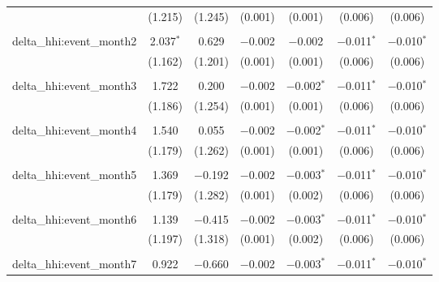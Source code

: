 \begin{table}[H]
{\begin{tabular}{@{\extracolsep{5pt}}lcccccc}
   & (1.215) & (1.245) & (0.001) & (0.001) & (0.006) & (0.006) \\  

   & & & & & & \\  

  delta\_hhi:event\_month2 & 2.037$^{*}$ & 0.629 & $-$0.002 & $-$0.002 & $-$0.011$^{*}$ & $-$0.010$^{*}$ \\  

   & (1.162) & (1.201) & (0.001) & (0.001) & (0.006) & (0.006) \\  

   & & & & & & \\  

  delta\_hhi:event\_month3 & 1.722 & 0.200 & $-$0.002 & $-$0.002$^{*}$ & $-$0.011$^{*}$ & $-$0.010$^{*}$ \\  

   & (1.186) & (1.254) & (0.001) & (0.001) & (0.006) & (0.006) \\  

   & & & & & & \\  

  delta\_hhi:event\_month4 & 1.540 & 0.055 & $-$0.002 & $-$0.002$^{*}$ & $-$0.011$^{*}$ & $-$0.010$^{*}$ \\  

   & (1.179) & (1.262) & (0.001) & (0.001) & (0.006) & (0.006) \\  

   & & & & & & \\  

  delta\_hhi:event\_month5 & 1.369 & $-$0.192 & $-$0.002 & $-$0.003$^{*}$ & $-$0.011$^{*}$ & $-$0.010$^{*}$ \\  

   & (1.179) & (1.282) & (0.001) & (0.002) & (0.006) & (0.006) \\  

   & & & & & & \\  

  delta\_hhi:event\_month6 & 1.139 & $-$0.415 & $-$0.002 & $-$0.003$^{*}$ & $-$0.011$^{*}$ & $-$0.010$^{*}$ \\  

   & (1.197) & (1.318) & (0.001) & (0.002) & (0.006) & (0.006) \\  

   & & & & & & \\  

  delta\_hhi:event\_month7 & 0.922 & $-$0.660 & $-$0.002 & $-$0.003$^{*}$ & $-$0.011$^{*}$ & $-$0.010$^{*}$ \\  


\end{tabular}}
\end{table}
